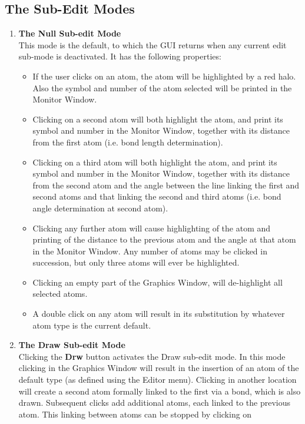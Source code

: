 \subsection{The Sub-Edit Modes \label{subeditmodes}}
\begin{enumerate}
\item {\bf The Null Sub-edit Mode}\\
  This mode is the default, to which the GUI returns when any current edit
  sub-mode is deactivated. It has the following properties:
\begin{itemize}
\item If the user clicks on an atom, the atom will be highlighted by a red
  halo. Also the symbol and number of the atom selected will be printed in the
  Monitor Window.  
\item Clicking on a second atom will both highlight the atom,
  and print its symbol and number in the Monitor Window, together with its
  distance from the first atom (i.e. bond length determination).  
\item Clicking on a third atom will both highlight the atom, and print its
  symbol and number in the Monitor Window, together with its distance from the
  second atom and the angle between the line linking the first and second
  atoms and that linking the second and third atoms (i.e. bond angle
  determination at second atom).  
\item Clicking any further atom will cause highlighting of the atom and
  printing of the distance to the previous atom and the angle at that atom in
  the Monitor Window. Any number of atoms may be clicked in succession, but
  only three atoms will ever be highlighted.  
\item Clicking an empty part of the Graphics Window, will de-highlight all
  selected atoms.  
\item A double click on any atom will result in its substitution by whatever
  atom type is the current default.
\end{itemize}
\item {\bf The Draw Sub-edit Mode}\\
  Clicking the {\bf Drw} button activates the Draw sub-edit mode. In this mode
  clicking in the Graphics Window will result in the insertion of an atom of
  the default type (as defined using the Editor menu). Clicking in another
  location will create a second atom formally linked to the first via a bond,
  which is also drawn. Subsequent clicks add additional atoms, each linked to
  the previous atom. This linking between atoms can be stopped by clicking on

\end{enumerate}
